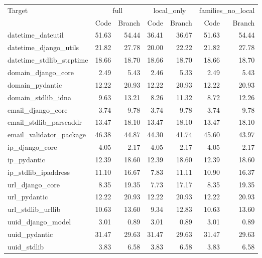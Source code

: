 \begin{tabular}{lrrrrrr}
\toprule
Target & \multicolumn{2}{c}{full} & \multicolumn{2}{c}{local\_only} & \multicolumn{2}{c}{families\_no\_local} \\
 & Code & Branch & Code & Branch & Code & Branch \\
\midrule
datetime\_dateutil & 51.63 & 54.44 & 36.41 & 36.67 & 51.63 & 54.44 \\
datetime\_django\_utils & 21.82 & 27.78 & 20.00 & 22.22 & 21.82 & 27.78 \\
datetime\_stdlib\_strptime & 18.66 & 18.70 & 18.66 & 18.70 & 18.66 & 18.70 \\
domain\_django\_core & 2.49 & 5.43 & 2.46 & 5.33 & 2.49 & 5.43 \\
domain\_pydantic & 12.22 & 20.93 & 12.22 & 20.93 & 12.22 & 20.93 \\
domain\_stdlib\_idna & 9.63 & 13.21 & 8.26 & 11.32 & 8.72 & 12.26 \\
email\_django\_core & 3.74 & 9.78 & 3.74 & 9.78 & 3.74 & 9.78 \\
email\_stdlib\_parseaddr & 13.47 & 18.10 & 13.47 & 18.10 & 13.47 & 18.10 \\
email\_validator\_package & 46.38 & 44.87 & 44.30 & 41.74 & 45.60 & 43.97 \\
ip\_django\_core & 4.05 & 2.17 & 4.05 & 2.17 & 4.05 & 2.17 \\
ip\_pydantic & 12.39 & 18.60 & 12.39 & 18.60 & 12.39 & 18.60 \\
ip\_stdlib\_ipaddress & 11.10 & 16.67 & 7.83 & 11.11 & 10.90 & 16.37 \\
url\_django\_core & 8.35 & 19.35 & 7.73 & 17.17 & 8.35 & 19.35 \\
url\_pydantic & 12.22 & 20.93 & 12.22 & 20.93 & 12.22 & 20.93 \\
url\_stdlib\_urllib & 10.63 & 13.60 & 9.34 & 12.83 & 10.63 & 13.60 \\
uuid\_django\_model & 3.01 & 0.89 & 3.01 & 0.89 & 3.01 & 0.89 \\
uuid\_pydantic & 31.47 & 29.63 & 31.47 & 29.63 & 31.47 & 29.63 \\
uuid\_stdlib & 3.83 & 6.58 & 3.83 & 6.58 & 3.83 & 6.58 \\
\bottomrule
\end{tabular}
